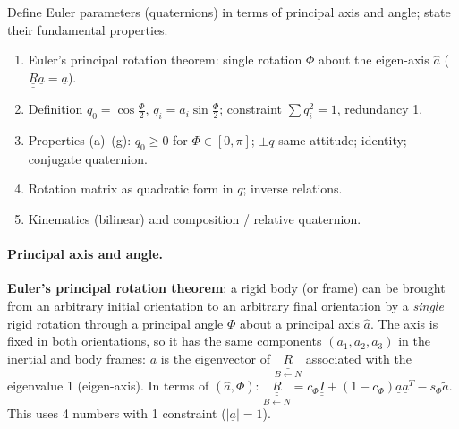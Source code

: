 \begin{qbox}
Define Euler parameters (quaternions) in terms of principal axis and angle; state their fundamental properties.
\end{qbox}

\begin{outline}
\begin{enumerate}
\item Euler's principal rotation theorem: single rotation $\Phi$ about the eigen-axis $\hat a$ ($\underline{\underline R}\underline a=\underline a$).
\item Definition $q_0=\cos\frac\Phi2$, $q_i=a_i\sin\frac\Phi2$; constraint $\sum q_i^2=1$, redundancy 1.
\item Properties (a)--(g): $q_0\ge0$ for $\Phi\in[0,\pi]$; $\pm q$ same attitude; identity; conjugate quaternion.
\item Rotation matrix as quadratic form in $q$; inverse relations.
\item Kinematics (bilinear) and composition / relative quaternion.
\end{enumerate}
\end{outline}

\answer
\paragraph{Principal axis and angle.} \textbf{Euler's principal rotation theorem}: a rigid body (or frame) can be brought from an arbitrary
initial orientation to an arbitrary final orientation by a \emph{single} rigid rotation through a principal angle $\Phi$ about a principal
axis $\hat a$. The axis is fixed in both orientations, so it has the same components $(a_1,a_2,a_3)$ in the inertial and body frames:
$\underline a$ is the eigenvector of $\underset{B\leftarrow N}{\underline{\underline R}}$ associated with the eigenvalue 1 (eigen-axis). In terms of
$(\hat a,\Phi)$: $\underset{B\leftarrow N}{\underline{\underline R}}=c_\Phi\underline{\underline I}+(1-c_\Phi)\underline a\underline a^T-s_\Phi\tilde a$. This uses 4 numbers with 1
constraint ($|\underline a|=1$).

